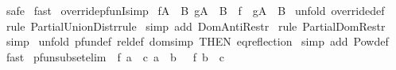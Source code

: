 \begin{isabellebody}
\isamarkupfalse%
\ safe\isanewline
{}\isamarkupfalse%
\ fast\isanewline
{}\isamarkupfalse%
%
\endisatagproof
{\isafoldproof}%
%
\isadelimproof
\isanewline
%
\endisadelimproof
\isanewline
{}\isamarkupfalse%
\ override{\isacharunderscore}pfunI{\isacharbrackleft}simp{\isacharbrackright}{\isacharcolon}\ \isanewline
{\isachardoublequoteopen}{\isacharbrackleft}{\isacharbar}f{\isacharcolon}{\isacharparenleft}A\ {\isacharminus}{\isacharbar}{\isacharminus}{\isachargreater}\ B{\isacharparenright}{\isacharsemicolon}\ g{\isacharcolon}{\isacharparenleft}A\ {\isacharminus}{\isacharbar}{\isacharminus}{\isachargreater}\ B{\isacharparenright}{\isacharbar}{\isacharbrackright}\ {\isacharequal}{\isacharequal}{\isachargreater}\ {\isacharparenleft}{\isacharparenleft}f\ {\isacharparenleft}{\isacharplus}{\isacharparenright}\ g{\isacharparenright}{\isacharcolon}{\isacharparenleft}A\ {\isacharminus}{\isacharbar}{\isacharminus}{\isachargreater}\ B{\isacharparenright}{\isacharparenright}{\isachardoublequoteclose}\isanewline
%
\isadelimproof
%
\endisadelimproof
%
\isatagproof
{}\isamarkupfalse%
\ {\isacharparenleft}unfold\ override{\isacharunderscore}def{\isacharparenright}\isanewline
{}\isamarkupfalse%
\ {\isacharparenleft}rule\ Partial{\isacharunderscore}Union{\isacharunderscore}Distr{\isacharunderscore}rule{\isacharparenright}\isanewline
{}\isamarkupfalse%
\ {\isacharparenleft}simp\ add{\isacharcolon}\ Dom{\isacharunderscore}Anti{\isacharunderscore}Restr{\isacharparenright}\isanewline
{}\isamarkupfalse%
\ {\isacharparenleft}rule\ Partial{\isacharunderscore}Dom{\isacharunderscore}Restr{\isacharparenright}\isanewline
{}\isamarkupfalse%
\ simp\isanewline
{}\isamarkupfalse%
\ {\isacharparenleft}unfold\ pfun{\isacharunderscore}def\ rel{\isacharunderscore}def\ dom{\isacharunderscore}simp\ {\isacharbrackleft}THEN\ eq{\isacharunderscore}reflection{\isacharbrackright}{\isacharparenright}\isanewline
{}\isamarkupfalse%
\ {\isacharparenleft}simp\ add{\isacharcolon}\ Pow{\isacharunderscore}def{\isacharparenright}\isanewline
{}\isamarkupfalse%
\ fast{\isacharplus}\isanewline
{}\isamarkupfalse%
%
\endisatagproof
{\isafoldproof}%
%
\isadelimproof
\isanewline
%
\endisadelimproof
\isanewline
{}\isamarkupfalse%
\ pfun{\isacharunderscore}subset{\isacharbrackleft}elim{\isacharbang}{\isacharbrackright}{\isacharcolon}\ {\isachardoublequoteopen}{\isacharbrackleft}{\isacharbar}\ f{\isacharcolon}\ {\isacharparenleft}a\ {\isacharminus}{\isacharbar}{\isacharminus}{\isachargreater}\ c{\isacharparenright}{\isacharsemicolon}\ a\ {\isacharless}{\isacharequal}\ b\ {\isacharbar}{\isacharbrackright}\ {\isacharequal}{\isacharequal}{\isachargreater}\ {\isacharparenleft}f{\isacharcolon}\ {\isacharparenleft}b\ {\isacharminus}{\isacharbar}{\isacharminus}{\isachargreater}\ c{\isacharparenright}{\isacharparenright}{\isachardoublequoteclose}\isanewline

\end{isabellebody}
